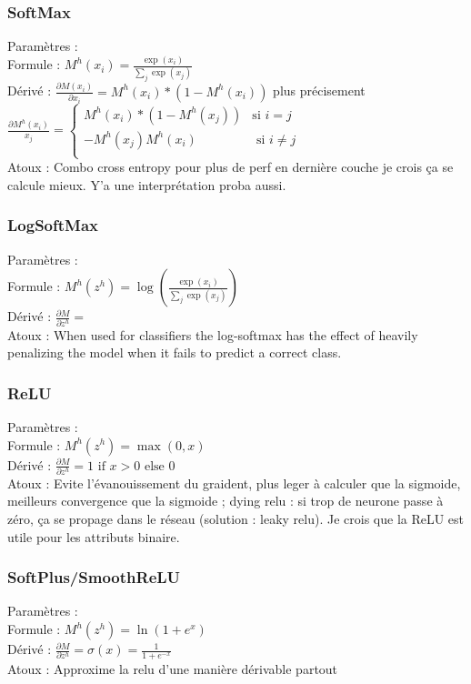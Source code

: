 \documentclass{article}
\begin{document}
\begin{multicols}{2}
\subsubsection{SoftMax}
Paramètres : \\
Formule : $ M^h(x_i) = \frac{\exp(x_i)}{\sum_j \exp(x_j)} $ \\
Dérivé : $ \frac{\partial M(x_i)}{\partial x_i} = M^h(x_i) * (1 - M^h(x_i)) $ plus précisement $ \frac{\partial M^h(x_i)}{x_j} = \begin{cases}
    M^h(x_i) * ( 1 - M^h(x_j) ) &\text{si } i = j \\
    - M^h(x_j) M^h(x_i) &\text{ si } i \neq j \\
\end{cases}  $  \\
Atoux : Combo cross entropy pour plus de perf en dernière couche je crois ça se calcule mieux. Y'a une interprétation proba aussi.


\subsubsection{LogSoftMax}
Paramètres : \\
Formule : $ M^h(z^h) = \log ( \frac{ \exp(x_i) }{ \sum_j \exp(x_j) } ) $ \\
Dérivé : $ \frac{\partial M}{\partial z^h} =  $ \\
Atoux : When used for classifiers the log-softmax has the effect of heavily penalizing the model when it fails to predict a correct class.

\subsubsection{ReLU}
Paramètres : \\
Formule : $ M^h(z^h) = \max (0, x) $ \\
Dérivé : $ \frac{\partial M}{\partial z^h} = 1 \text{ if } x > 0 \text{ else } 0 $ \\
Atoux : Evite l'évanouissement du graident, plus leger à calculer que la sigmoide, meilleurs convergence que la sigmoide ; dying relu : si trop de neurone passe à zéro, ça se propage dans le réseau (solution : leaky relu). Je crois que la ReLU est utile pour les attributs binaire.

\subsubsection{SoftPlus/SmoothReLU}
Paramètres : \\
Formule : $ M^h(z^h) = \ln (1 + e^x) $ \\
Dérivé : $ \frac{\partial M}{\partial z^h} = \sigma (x) = \frac{1}{1 + e^{-x}} $ \\
Atoux : Approxime la relu d'une manière dérivable partout


\end{multicols}
\end{document}
